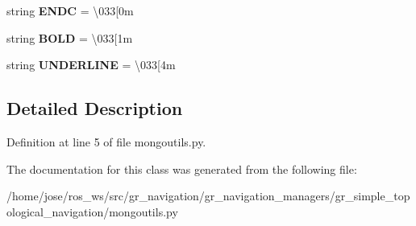 \begin{DoxyCompactItemize}
string {\bfseries E\+N\+DC} = \textquotesingle{}\textbackslash{}033\mbox{[}0m\textquotesingle{}
\item 
\mbox{\label{classmongoutils_1_1bcolors_ae508a86d075d5bfc1687d7bc21066a5e}} 
string {\bfseries B\+O\+LD} = \textquotesingle{}\textbackslash{}033\mbox{[}1m\textquotesingle{}
\item 
\mbox{\label{classmongoutils_1_1bcolors_afeebb4a9cdd084b9155c27e2c364a3b6}} 
string {\bfseries U\+N\+D\+E\+R\+L\+I\+NE} = \textquotesingle{}\textbackslash{}033\mbox{[}4m\textquotesingle{}
\end{DoxyCompactItemize}


\subsection{Detailed Description}


Definition at line 5 of file mongoutils.\+py.



The documentation for this class was generated from the following file\+:\begin{DoxyCompactItemize}
\item 
/home/jose/ros\+\_\+ws/src/gr\+\_\+navigation/gr\+\_\+navigation\+\_\+managers/gr\+\_\+simple\+\_\+topological\+\_\+navigation/mongoutils.\+py\end{DoxyCompactItemize}
